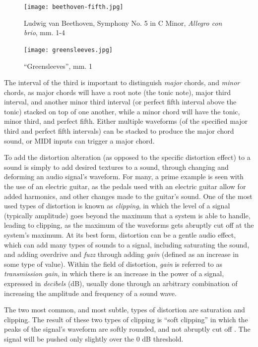 \begin{figure}[ht]
  \centering
  \texttt{[image: beethoven-fifth.jpg]}
  \caption{Ludwig van Beethoven, Symphony No. 5 in C Minor, \textit{Allegro con brio}, mm. 1-4}
  \label{fig:beethoven-fifth}
\end{figure}

\begin{figure}[ht]
  \centering
  \texttt{[image: greensleeves.jpg]}
  \caption{``Greensleeves'', mm. 1}
  \label{fig:greensleeves}
\end{figure}

The interval of the third is important to distinguish \textit{major} chords, and \textit{minor} chords, as major chords will have a root note (the tonic note), major third interval, and another minor third interval (or perfect fifth interval above the tonic) stacked on top of one another, while a minor chord will have the tonic, minor third, and perfect fifth. Either multiple waveforms (of the specified major third and perfect fifth intervals) can be stacked to produce the major chord sound, or MIDI inputs can trigger a major chord.

To add the distortion alteration (as opposed to the specific distortion effect) to a sound is simply to add desired textures to a sound, through changing and deforming an audio signal's waveform. For many, a prime example is seen with the use of an electric guitar, as the pedals used with an electric guitar allow for added harmonics, and other changes made to the guitar's sound. One of the most used types of distortion is known as \textit{clipping}, in which the level of a signal (typically amplitude) goes beyond the maximum that a system is able to handle, leading to clipping, as the maximum of the waveforms gets abruptly cut off at the system's maximum. At its best form, distortion can be a gentle audio effect, which can add many types of sounds to a signal, including saturating the sound, and adding overdrive and \textit{fuzz} through adding \textit{gain} (defined as an increase in some type of value). Within the field of distortion, \textit{gain} is referred to as \textit{transmission gain}, in which there is an increase in the power of a signal, expressed in \textit{decibels} (dB), usually done through an arbitrary combination of increasing the amplitude and frequency of a sound wave.

The two most common, and most subtle, types of distortion are saturation and clipping. The result of these two types of clipping is ``soft clipping'' in which the peaks of the signal's waveform are softly rounded, and not abruptly cut off \cite{Tarr_2019}. The signal will be pushed only slightly over the 0 dB threshold. 

